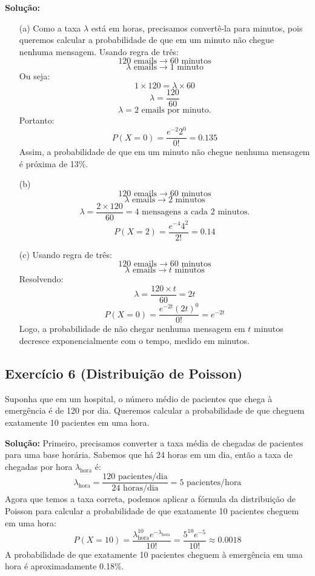 \documentclass{article}
\begin{document}
\vspace{0.5cm}
\textbf{Solução:}
\begin{enumerate}
    \item[(a)] Como a taxa $\lambda$ está em horas, precisamos convertê-la para minutos, pois queremos calcular a probabilidade de que em um minuto não chegue nenhuma mensagem. Usando regra de três:
        $$
        120 \text{ emails} \rightarrow 60 \text{ minutos}
        $$
        $$
        \lambda \text{ emails} \rightarrow 1 \text{ minuto}
        $$
    Ou seja:
        $$
        1 \times 120 = \lambda \times 60
        $$
        $$
        \lambda = \frac{120}{60}
        $$
        $$
        \lambda = 2 \text{ emails por minuto.}
        $$
    Portanto:
        $$
        P(X = 0) = \frac{e^{-2} 2^0}{0!} = 0.135
        $$
    Assim, a probabilidade de que em um minuto não chegue nenhuma mensagem é próxima de 13\%.
    \item[(b)] 
        $$
        120 \text{ emails} \rightarrow 60 \text{ minutos}
        $$
        $$
        \lambda \text{ emails} \rightarrow 2 \text{ minutos}
        $$
        $$
        \lambda = \frac{2 \times 120}{60} = 4 \text{ mensagens a cada 2 minutos.}
        $$
        $$
        P(X = 2) = \frac{e^{-4} 4^2}{2!} = 0.14
        $$
    \item[(c)] Usando regra de três:
        $$
        120 \text{ emails} \rightarrow 60 \text{ minutos}
        $$
        $$
        \lambda \text{ emails} \rightarrow t \text{ minutos}
        $$
        Resolvendo:
        $$
        \lambda = \frac{120 \times t}{60} = 2t
        $$
        $$
        P(X = 0) = \frac{e^{-2t}(2t)^0}{0!} = e^{-2t}
        $$
    Logo, a probabilidade de não chegar nenhuma mensagem em $t$ minutos decresce exponencialmente com o tempo, medido em minutos.
\end{enumerate}

\subsection{Exercício 6 (Distribuição de Poisson)}
Suponha que em um hospital, o número médio de pacientes que chega à emergência é de 120 por dia. Queremos calcular a probabilidade de que cheguem exatamente 10 pacientes em uma hora.

\vspace{0.5cm}
\textbf{Solução:}
Primeiro, precisamos converter a taxa média de chegadas de pacientes para uma base horária. Sabemos que há 24 horas em um dia, então a taxa de chegadas por hora $\lambda_{\text{hora}}$ é:
    $$
    \lambda_{\text{hora}} = \frac{120 \text{ pacientes/dia}}{24 \text{ horas/dia}} = 5 \text{ pacientes/hora}
    $$
    Agora que temos a taxa correta, podemos aplicar a fórmula da distribuição de Poisson para calcular a probabilidade de que exatamente 10 pacientes cheguem em uma hora:
    $$
    P(X = 10) = \frac{\lambda_{\text{hora}}^{10} e^{-\lambda_{\text{hora}}}}{10!} = 
    \frac{5^{10} e^{-5}}{10!} \approx 0.0018
    $$
    A probabilidade de que exatamente 10 pacientes cheguem à emergência em uma hora é aproximadamente 0.18\%.
\end{document}
